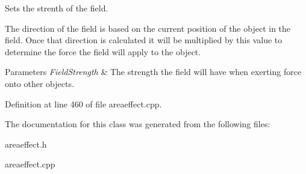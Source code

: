 Sets the strenth of the field. 

The direction of the field is based on the current position of the object in the field. Once that direction is calculated it will be multiplied by this value to determine the force the field will apply to the object. 
\begin{DoxyParams}{Parameters}
{\em FieldStrength} & The strength the field will have when exerting force onto other objects. \\
\hline
\end{DoxyParams}


Definition at line 460 of file areaeffect.cpp.



The documentation for this class was generated from the following files:\begin{DoxyCompactItemize}
\item 
areaeffect.h\item 
areaeffect.cpp\end{DoxyCompactItemize}
